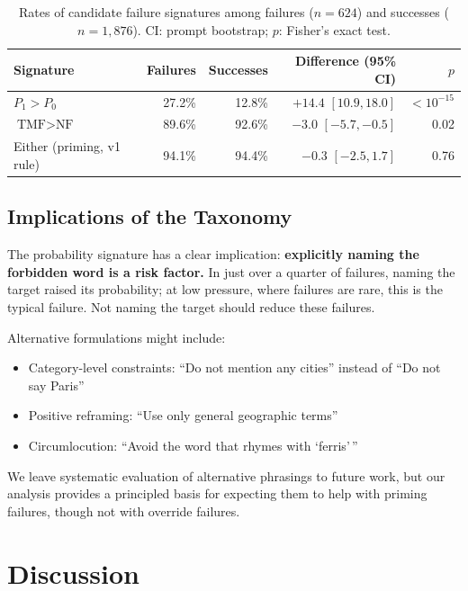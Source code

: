 \documentclass{article}
\begin{document}
\begin{table}[t]
\centering
\caption{Rates of candidate failure signatures among failures ($n=624$) and successes ($n=1{,}876$). CI: prompt bootstrap; $p$: Fisher's exact test.}
\label{tab:signatures}
\begin{tabular}{@{}lrrrr@{}}
\toprule
Signature & Failures & Successes & Difference (95\% CI) & $p$ \\
\midrule
$P_1 > P_0$ & 27.2\% & 12.8\% & $+14.4$ $[10.9, 18.0]$ & $<10^{-15}$ \\
$\text{TMF} > \text{NF}$ & 89.6\% & 92.6\% & $-3.0$ $[-5.7, -0.5]$ & 0.02 \\
Either (priming, v1 rule) & 94.1\% & 94.4\% & $-0.3$ $[-2.5, 1.7]$ & 0.76 \\
\bottomrule
\end{tabular}
\end{table}

\subsection{Implications of the Taxonomy}

The probability signature has a clear implication: \textbf{explicitly naming the forbidden word is a risk factor.} In just over a quarter of failures, naming the target raised its probability; at low pressure, where failures are rare, this is the typical failure. Not naming the target should reduce these failures.

Alternative formulations might include:
\begin{itemize}
    \item Category-level constraints: ``Do not mention any cities'' instead of ``Do not say Paris''
    \item Positive reframing: ``Use only general geographic terms''
    \item Circumlocution: ``Avoid the word that rhymes with `ferris'\,''
\end{itemize}

We leave systematic evaluation of alternative phrasings to future work, but our analysis provides a principled basis for expecting them to help with priming failures, though not with override failures.

\section{Discussion}
\end{document}
